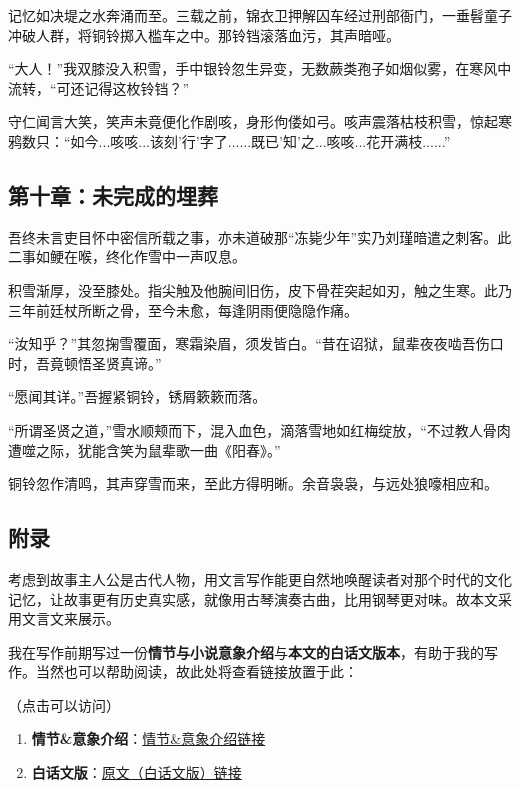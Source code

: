 \documentclass{article}
\begin{document}
	记忆如决堤之水奔涌而至。三载之前，锦衣卫押解囚车经过刑部衙门，一垂髫童子冲破人群，将铜铃掷入槛车之中。那铃铛滚落血污，其声暗哑。
	
	“大人！”我双膝没入积雪，手中银铃忽生异变，无数蕨类孢子如烟似雾，在寒风中流转，“可还记得这枚铃铛？”
	
	守仁闻言大笑，笑声未竟便化作剧咳，身形佝偻如弓。咳声震落枯枝积雪，惊起寒鸦数只：“如今...咳咳...该刻'行'字了......既已'知'之...咳咳...花开满枝......”
	
	\subsection{第十章：未完成的埋葬}
	
	吾终未言吏目怀中密信所载之事，亦未道破那“冻毙少年”实乃刘瑾暗遣之刺客。此二事如鲠在喉，终化作雪中一声叹息。
	
	积雪渐厚，没至膝处。指尖触及他腕间旧伤，皮下骨茬突起如刃，触之生寒。此乃三年前廷杖所断之骨，至今未愈，每逢阴雨便隐隐作痛。
	
	“汝知乎？”其忽掬雪覆面，寒霜染眉，须发皆白。“昔在诏狱，鼠辈夜夜啮吾伤口时，吾竟顿悟圣贤真谛。”
	
	“愿闻其详。”吾握紧铜铃，锈屑簌簌而落。
	
	“所谓圣贤之道，”雪水顺颊而下，混入血色，滴落雪地如红梅绽放，“不过教人骨肉遭噬之际，犹能含笑为鼠辈歌一曲《阳春》。”
	
	铜铃忽作清鸣，其声穿雪而来，至此方得明晰。余音袅袅，与远处狼嚎相应和。
	
	\clearpage
	
	\subsection{附录}
	
	考虑到故事主人公是古代人物，用文言写作能更自然地唤醒读者对那个时代的文化记忆，让故事更有历史真实感，就像用古琴演奏古曲，比用钢琴更对味。故本文采用文言文来展示。
	
	我在写作前期写过一份\textbf{情节与小说意象介绍}与\textbf{本文的白话文版本}，有助于我的写作。当然也可以帮助阅读，故此处将查看链接放置于此：
	
	（点击可以访问）
	
	\begin{enumerate}[noitemsep, label={{\arabic*})}]
		\item \textbf{情节\&意象介绍}：\href{https://github.com/SoftGhostGU/In_class_related/blob/main/%E4%B8%AD%E5%9B%BD%E6%96%87%E5%8C%96%E9%80%9A%E8%AE%BA/%E6%83%85%E8%8A%82%E4%BB%8B%E7%BB%8D/%E6%95%85%E4%BA%8B%E6%83%85%E8%8A%82%E7%9B%B8%E5%85%B3.pdf}{情节\&意象介绍链接}
		\item \textbf{白话文版}：\href{https://github.com/SoftGhostGU/In_class_related/blob/main/%E4%B8%AD%E5%9B%BD%E6%96%87%E5%8C%96%E9%80%9A%E8%AE%BA/%E3%80%8A%E9%9B%AA%E4%B8%AD%E9%93%83%E3%80%8B-%E7%99%BD%E8%AF%9D%E6%96%87%E7%89%88/%E3%80%8A%E9%9B%AA%E4%B8%AD%E9%93%83%E3%80%8B-%E5%8E%9F%E6%96%87%E7%89%88.pdf}{原文（白话文版）链接}
	\end{enumerate}\textbf{}
	
\end{document}
